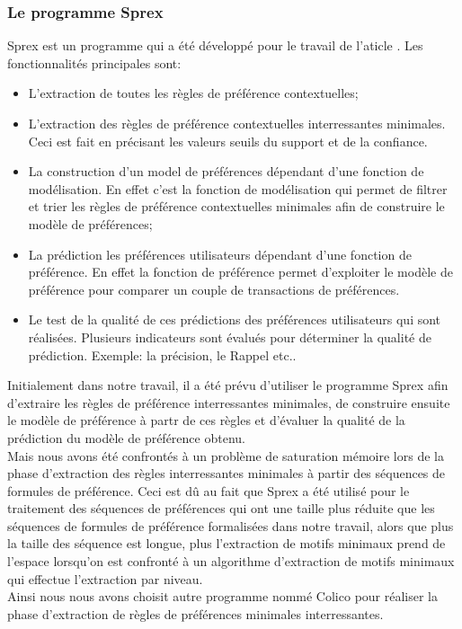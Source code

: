 \documentclass[a4paper,12pt,openany,oneside]{article}
\begin{document}
\subsubsection{Le programme Sprex}
Sprex est un programme qui a été développé pour le travail de l'aticle \cite{..}. Les fonctionnalités principales sont:\\

\begin{itemize}
\item L'extraction de toutes les règles de préférence contextuelles;
\item L'extraction des règles de préférence contextuelles interressantes minimales. Ceci est fait en précisant les valeurs seuils du support et de la confiance.
\item La construction d'un model de préférences dépendant d'une fonction de modélisation. En effet c'est la fonction de modélisation qui permet de filtrer et trier les règles de préférence contextuelles minimales afin de construire le modèle de préférences;
\item La prédiction les préférences utilisateurs dépendant d'une fonction de préférence. En effet la fonction de préférence permet d'exploiter le modèle de préférence pour comparer un couple de transactions de préférences.
\item Le test de la qualité de ces prédictions des préférences utilisateurs qui sont réalisées. Plusieurs indicateurs sont évalués pour déterminer la qualité de prédiction. Exemple: la précision, le Rappel etc..\\
\end{itemize}

Initialement dans notre travail, il a été prévu d'utiliser le programme Sprex afin d'extraire les règles de préférence interressantes minimales, de construire ensuite le modèle de préférence  à partr de ces règles et d'évaluer la qualité de la prédiction du modèle de préférence obtenu. \\
Mais nous avons été confrontés à un problème de saturation mémoire lors de la phase d'extraction des règles interressantes minimales à partir des séquences de formules de préférence. Ceci est dû au fait que Sprex a été utilisé pour le traitement des séquences de préférences qui ont une taille plus réduite que les séquences de formules de préférence formalisées dans notre travail, alors que plus la taille des séquence est longue, plus l'extraction de motifs minimaux prend de l'espace lorsqu'on est confronté à un algorithme d'extraction de motifs minimaux qui effectue l'extraction par niveau.\\
Ainsi nous nous avons choisit autre programme  nommé Colico pour réaliser la phase d'extraction de règles de préférences minimales interressantes. 
\end{document}
